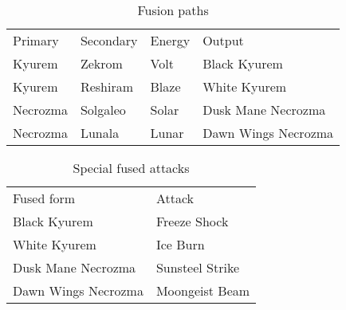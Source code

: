 \begin{table}
\centering
\begin{tabular}{llll}
  Primary & Secondary & Energy & Output\\
\Midrule
  Kyurem & Zekrom & Volt & Black Kyurem \\
  Kyurem & Reshiram & Blaze & White Kyurem \\
  Necrozma & Solgaleo & Solar & Dusk Mane Necrozma \\
  Necrozma & Lunala & Lunar & Dawn Wings Necrozma \\
\end{tabular}
  \caption{Fusion paths}
  \label{table:fusion}
\end{table}
\begin{table}
\centering
\begin{tabular}{ll}
  Fused form & Attack\\
\Midrule
  Black Kyurem & Freeze Shock \\
  White Kyurem & Ice Burn\\
  Dusk Mane Necrozma & Sunsteel Strike\\
  Dawn Wings Necrozma & Moongeist Beam\\
\end{tabular}
  \caption{Special fused attacks}
  \label{table:fusionattacks}
\end{table}

